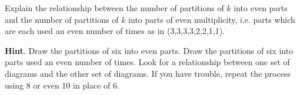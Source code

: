 \documentclass{book}
\begin{document}
\setcounter{cpjt}{306}
\addtocounter{cpjt}{-1}
\begin{activity}\label{partition-even-mult-even-use}
\hypertarget{p-1510}{}%
Explain the relationship between the number of partitions of \(k\) into even parts and the number of partitions of \(k\) into parts of even multiplicity, i.e. parts which are each used an even number of times as in (3,3,3,3,2,2,1,1).%
\par\smallskip%
\noindent\textbf{Hint}.\hypertarget{hint-192}{}\quad%
\hypertarget{p-1511}{}%
Draw the partitions of six into even parts. Draw the partitions of six into parts used an even number of times. Look for a relationship between one set of diagrams and the other set of diagrams. If you have trouble, repeat the process using 8 or even 10 in place of 6.%
\par\smallskip%
\noindent\end{activity}

\clearpage
\end{document}
